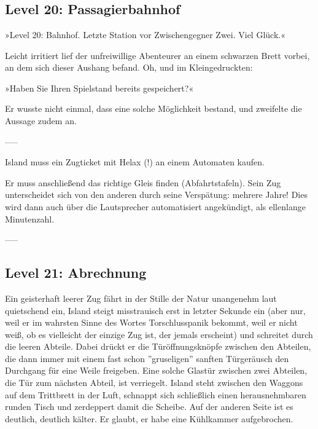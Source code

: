 \chapter{}


\section{Level 20: Passagierbahnhof}

»Level 20: Bahnhof. Letzte Station vor Zwischengegner Zwei. Viel Glück.«

Leicht irritiert lief der unfreiwillige Abenteurer an einem schwarzen Brett vorbei, an dem sich dieser Aushang befand. Oh, und im Kleingedruckten:

»Haben Sie Ihren Spielstand bereits gespeichert?«

Er wusste nicht einmal, dass eine solche Möglichkeit bestand, und zweifelte die Aussage zudem an.

-----

Island muss ein Zugticket mit Helax (!) an einem Automaten kaufen.

Er muss anschließend das richtige Gleis finden (Abfahrtstafeln). Sein Zug unterscheidet sich von den anderen durch seine Verspätung: mehrere Jahre! Dies wird dann auch über die Lautsprecher automatisiert angekündigt, als ellenlange Minutenzahl.

-----

\section{Level 21: Abrechnung}

Ein geisterhaft leerer Zug fährt in der Stille der Natur unangenehm laut quietschend ein, Island steigt misstrauisch erst in letzter Sekunde ein (aber nur, weil er im wahrsten Sinne des Wortes Torschlusspanik bekommt, weil er nicht weiß, ob es vielleicht der einzige Zug ist, der jemals erscheint) und schreitet durch die leeren Abteile. Dabei drückt er die Türöffnungsknöpfe zwischen den Abteilen, die dann immer mit einem fast schon ''gruseligen'' sanften Türgeräusch den Durchgang für eine Weile freigeben. Eine solche Glastür zwischen zwei Abteilen, die Tür zum nächsten Abteil, ist verriegelt. Island steht zwischen den Waggons auf dem Trittbrett in der Luft, schnappt sich schließlich einen herausnehmbaren runden Tisch und zerdeppert damit die Scheibe. Auf der anderen Seite ist es deutlich, deutlich kälter. Er glaubt, er habe eine Kühlkammer aufgebrochen.

